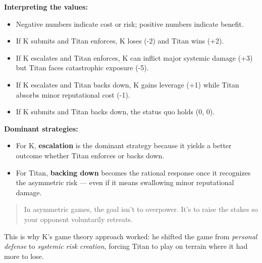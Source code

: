 \medskip

\textbf{Interpreting the values:}

\begin{itemize}
    \item Negative numbers indicate cost or risk; positive numbers indicate benefit.
    \item If K submits and Titan enforces, K loses (-2) and Titan wins (+2).
    \item If K escalates and Titan enforces, K can inflict major systemic damage (+3) but Titan faces catastrophic exposure (-5).
    \item If K escalates and Titan backs down, K gains leverage (+1) while Titan absorbs minor reputational cost (-1).
    \item If K submits and Titan backs down, the status quo holds (0, 0).
\end{itemize}

\medskip

\textbf{Dominant strategies:}

\begin{itemize}
    \item For K, \textbf{escalation} is the dominant strategy because it yields a better outcome whether Titan enforces or backs down.
    \item For Titan, \textbf{backing down} becomes the rational response once it recognizes the asymmetric risk — even if it means swallowing minor reputational damage.
\end{itemize}

\begin{quote}
    In asymmetric games, the goal isn’t to overpower.  
    It’s to raise the stakes so your opponent voluntarily retreats.
\end{quote}

This is why K’s game theory approach worked:  
he shifted the game from \textit{personal defense} to \textit{systemic risk creation}, forcing Titan to play on terrain where it had more to lose.

